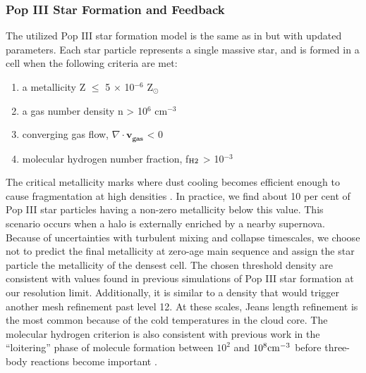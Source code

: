 \documentclass[fleqn,usenatbib]{mnras}
\begin{document}
\subsubsection{Pop III Star Formation and Feedback }
The utilized Pop III star formation model is the same as in \citet{Wise08_Gal} but with updated parameters. Each star particle represents a single massive star, and is formed in a cell when the following criteria are met: 
\begin{enumerate}
	\item a metallicity Z $\leq$ 5 $\times$ 10$^{-6}$ Z$_{\odot}$

	\item a gas number density n > 10$^{6}$ cm$^{-3}$

	\item converging gas flow, $\nabla \cdot \mathbf{v_{gas}}$ < 0 

	\item molecular hydrogen number fraction, f$_{\rm H2}$ > 10$^{-3}$
\end{enumerate}
The critical metallicity marks where dust cooling becomes efficient enough to cause fragmentation at high densities \citep[e.g.][]{Schneider06_Frag}.  In practice, we find about 10 per cent of Pop III star particles having a non-zero metallicity below this value.  This scenario occurs when a halo is externally enriched by a nearby supernova.  Because of uncertainties with turbulent mixing and collapse timescales, we choose not to predict the final metallicity at zero-age main sequence and assign the star particle the metallicity of the densest cell.  The chosen threshold density are consistent with values found in previous simulations of Pop III star formation \citep[e.g.][]{Hirano15} at our resolution limit.  Additionally, it is similar to a density that would trigger another mesh refinement past level 12.  At these scales, Jeans length refinement is the most common because of the cold temperatures in the cloud core.  The molecular hydrogen criterion is also consistent with previous work in the ``loitering'' phase of molecule formation between $10^2$ and $10^8 \cubecm$ before three-body reactions become important \citep[e.g.][]{Omukai10}.
\end{document}
